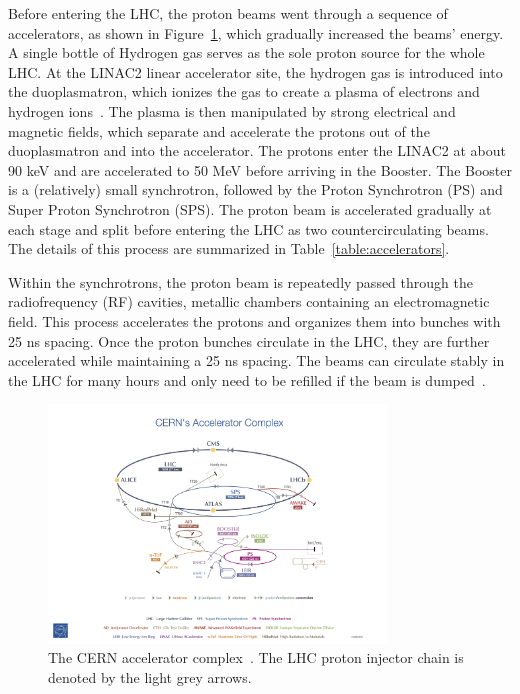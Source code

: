 Before entering the LHC, the proton beams went through a sequence of accelerators, as shown in Figure~\ref{fig:cern_complex}, which gradually increased the beams' energy. 
A single bottle of Hydrogen gas serves as the sole proton source for the whole LHC. 
At the LINAC2 linear accelerator site, the hydrogen gas is introduced into the duoplasmatron, which ionizes the gas to create a plasma of electrons and hydrogen ions~\cite{Burnet:1359959}. The plasma is then manipulated by strong electrical and magnetic fields, which separate and accelerate the protons out of the duoplasmatron and into the accelerator. 
The protons enter the LINAC2 at about 90 keV and are accelerated to 50 MeV before arriving in the Booster.
The Booster is a (relatively) small synchrotron, followed by the Proton Synchrotron (PS) and Super Proton Synchrotron (SPS). The proton beam is accelerated gradually at each stage and split before entering the LHC as two countercirculating beams. The details of this process are summarized in Table~\ref{table:accelerators}.

Within the synchrotrons, the proton beam is repeatedly passed through the radiofrequency (RF) cavities, metallic chambers containing an electromagnetic field.
This process accelerates the protons and organizes them into bunches with 25 ns spacing.
Once the proton bunches circulate in the LHC, they are further accelerated while maintaining a 25 ns spacing. The beams can circulate stably in the LHC for many hours and only need to be refilled if the beam is dumped~\cite{LyndonEvans_2008}.

\begin{figure}[ht]
    \centering
    \includegraphics[width=0.8\textwidth]{figures/LHC/CERN_ComplexL.jpg}
    \caption[]{The CERN accelerator complex~\cite{Haffner:1621894}. The LHC proton injector chain is denoted by the light grey arrows.}
    \label{fig:cern_complex}
\end{figure}

